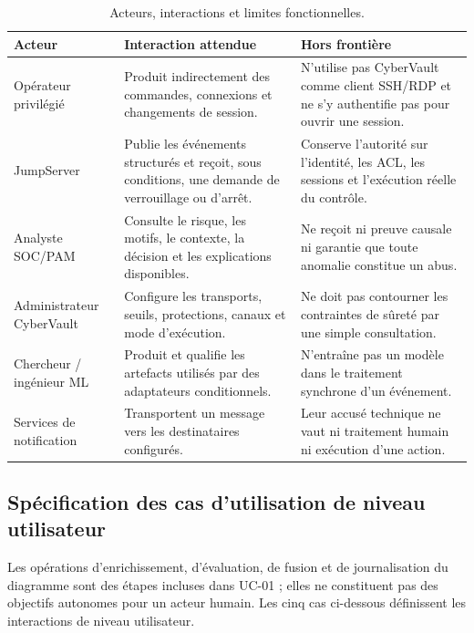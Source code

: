 \documentclass[11pt,a4paper,oneside]{report}
\theoremstyle{definition}
\theoremstyle{plain}
\begin{document}
\begin{table}[H]\centering\small
\begin{tabularx}{\textwidth}{p{2.7cm} X X}\toprule
\textbf{Acteur} & \textbf{Interaction attendue} & \textbf{Hors frontière} \\\midrule
Opérateur privilégié & Produit indirectement des commandes, connexions et changements de session. & N'utilise pas CyberVault comme client SSH/RDP et ne s'y authentifie pas pour ouvrir une session. \\
JumpServer & Publie les événements structurés et reçoit, sous conditions, une demande de verrouillage ou d'arrêt. & Conserve l'autorité sur l'identité, les ACL, les sessions et l'exécution réelle du contrôle. \\
Analyste SOC/PAM & Consulte le risque, les motifs, le contexte, la décision et les explications disponibles. & Ne reçoit ni preuve causale ni garantie que toute anomalie constitue un abus. \\
Administrateur CyberVault & Configure les transports, seuils, protections, canaux et mode d'exécution. & Ne doit pas contourner les contraintes de sûreté par une simple consultation. \\
Chercheur / ingénieur ML & Produit et qualifie les artefacts utilisés par des adaptateurs conditionnels. & N'entraîne pas un modèle dans le traitement synchrone d'un événement. \\
Services de notification & Transportent un message vers les destinataires configurés. & Leur accusé technique ne vaut ni traitement humain ni exécution d'une action. \\\bottomrule
\end{tabularx}
\caption{Acteurs, interactions et limites fonctionnelles.}
\label{tab:impl-actors}
\end{table}

\subsection{Spécification des cas d'utilisation de niveau utilisateur}

Les opérations d'enrichissement, d'évaluation, de fusion et de journalisation
du diagramme sont des étapes incluses dans UC-01 ; elles ne constituent pas
des objectifs autonomes pour un acteur humain. Les cinq cas ci-dessous
définissent les interactions de niveau utilisateur.
\end{document}
